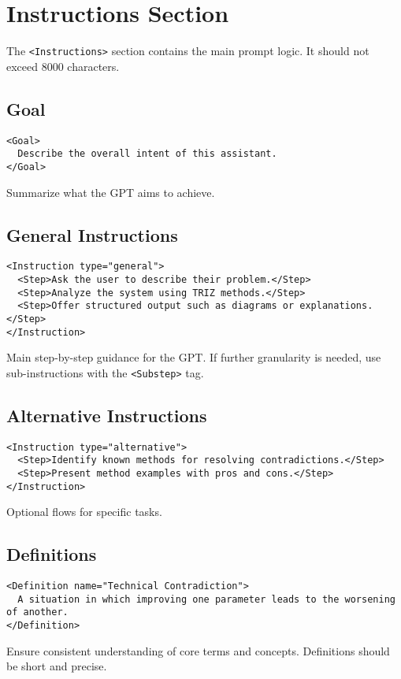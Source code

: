 \documentclass[a4paper,11pt]{refart}
\begin{document}
\section{Instructions Section}
The \lstinline!<Instructions>! section contains the main prompt logic. It should not exceed 8000 characters.

\subsection{Goal}
\begin{lstlisting}
<Goal>
  Describe the overall intent of this assistant.
</Goal>
\end{lstlisting}
Summarize what the GPT aims to achieve.

\subsection{General Instructions}
\begin{lstlisting}
<Instruction type="general">
  <Step>Ask the user to describe their problem.</Step>
  <Step>Analyze the system using TRIZ methods.</Step>
  <Step>Offer structured output such as diagrams or explanations.</Step>
</Instruction>
\end{lstlisting}
Main step-by-step guidance for the GPT. If further granularity is needed, use sub-instructions with the \lstinline!<Substep>! tag.

\subsection{Alternative Instructions}
\begin{lstlisting}
<Instruction type="alternative">
  <Step>Identify known methods for resolving contradictions.</Step>
  <Step>Present method examples with pros and cons.</Step>
</Instruction>
\end{lstlisting}
Optional flows for specific tasks.

\subsection{Definitions}
\begin{lstlisting}
<Definition name="Technical Contradiction">
  A situation in which improving one parameter leads to the worsening of another.
</Definition>
\end{lstlisting}
Ensure consistent understanding of core terms and concepts. Definitions should be short and precise.
\end{document}
